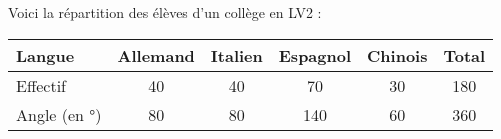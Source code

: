 \documentclass[../€Cours-complet/Cours-complet]{subfiles}
\begin{document}
\begin{exemple}
	Voici la répartition des élèves d'un collège en LV2 :

	\begin{center}
		\begin{tabular}{|l|c|c|c|c|c|}
			\hline
			Langue       & Allemand & Italien & Espagnol & Chinois & \textbf{Total}
			\\ \hline
			Effectif     & 40       & 40      & 70       & 30      & 180
			\\ \hline
			Angle (en °) & 80       & 80      & 140      & 60      & 360
			\\ \hline
		\end{tabular}
	\end{center}

	\begin{center}
	\end{center}
\end{exemple}
\end{document}
